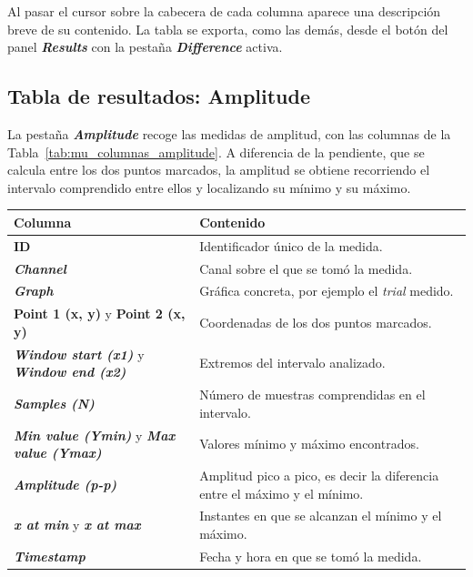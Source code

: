 \documentclass[11pt,a4paper]{article}
\begin{document}
    Al pasar el cursor sobre la cabecera de cada columna aparece una descripci\'on breve de su contenido. La tabla se exporta, como las dem\'as, desde el bot\'on \textbf{\textbullet\textbullet\textbullet} del panel \textbf{\textit{Results}} con la pesta\~na \textbf{\textit{Difference}} activa.


    \subsection{Tabla de resultados: Amplitude}
    La pesta\~na \textbf{\textit{Amplitude}} recoge las medidas de amplitud, con las columnas de la Tabla~\ref{tab:mu_columnas_amplitude}. A diferencia de la pendiente, que se calcula entre los dos puntos marcados, la amplitud se obtiene recorriendo el intervalo comprendido entre ellos y localizando su m\'inimo y su m\'aximo.

    \begin{center}
    \small
    \begin{tabularx}{\textwidth}{|p{}|X|}
    \hline
    \textbf{Columna} & \textbf{Contenido} \\
    \hline
    \textbf{ID} & Identificador \'unico de la medida. \\
    \hline
    \textbf{\textit{Channel}} & Canal sobre el que se tom\'o la medida. \\
    \hline
    \textbf{\textit{Graph}} & Gr\'afica concreta, por ejemplo el \textit{trial} medido. \\
    \hline
    \textbf{Point 1 (x, y)} y \textbf{Point 2 (x, y)} & Coordenadas de los dos puntos marcados. \\
    \hline
    \textbf{\textit{Window start (x1)}} y \textbf{\textit{Window end (x2)}} & Extremos del intervalo analizado. \\
    \hline
    \textbf{\textit{Samples (N)}} & N\'umero de muestras comprendidas en el intervalo. \\
    \hline
    \textbf{\textit{Min value (Ymin)}} y \textbf{\textit{Max value (Ymax)}} & Valores m\'inimo y m\'aximo encontrados. \\
    \hline
    \textbf{\textit{Amplitude (p-p)}} & Amplitud pico a pico, es decir la diferencia entre el m\'aximo y el m\'inimo. \\
    \hline
    \textbf{\textit{x at min}} y \textbf{\textit{x at max}} & Instantes en que se alcanzan el m\'inimo y el m\'aximo. \\
    \hline
    \textbf{\textit{Timestamp}} & Fecha y hora en que se tom\'o la medida. \\
    \hline
    \end{tabularx}
    \label{tab:mu_columnas_amplitude}
    \end{center}
\end{document}
